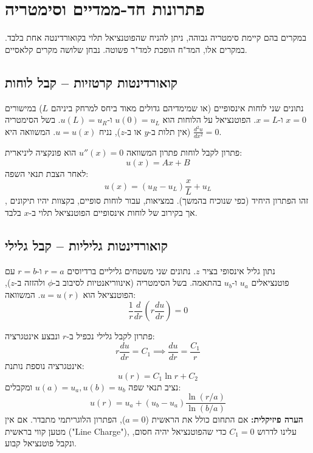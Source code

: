 \section{פתרונות חד-ממדיים וסימטריה}
במקרים בהם קיימת סימטריה גבוהה, ניתן להניח שהפוטנציאל תלוי בקואורדינטה אחת בלבד. במקרים אלו, המד"ח הופכת למד"ר פשוטה. נבחן שלושה מקרים קלאסיים.

\subsection{קואורדינטות קרטזיות – קבל לוחות}
נתונים שני לוחות אינסופיים (או שמימדיהם גדולים מאוד ביחס למרחק ביניהם $L$) במישורים $x=0$ ו-$x=L$. הפוטנציאל על הלוחות הוא $u(0)=u_L$ ו-$u(L)=u_R$.
בשל הסימטריה (אין תלות ב-$y$ או ב-$z$), נניח $u=u(x)$. המשוואה היא $\frac{d^2 u}{dx^2} = 0$.
\begin{center}
    
\end{center}

\begin{examplebox}{פתרון לקבל לוחות}
פתרון המשוואה $u''(x)=0$ הוא פונקציה ליניארית:
\[ u(x) = Ax + B \]
לאחר הצבת תנאי השפה:
\[ u(x) = (u_R - u_L)\frac{x}{L} + u_L \]
זהו הפתרון היחיד (כפי שנוכיח בהמשך). במציאות, עבור לוחות סופיים, בקצוות יהיו תיקונים , אך בקירוב של לוחות אינסופיים הפוטנציאל תלוי ב-$x$ בלבד.
\end{examplebox}

\subsection{קואורדינטות גליליות – קבל גלילי}
נתון גליל אינסופי בציר $z$. נתונים שני משטחים גליליים ברדיוסים $r=a$ ו-$r=b$ עם פוטנציאלים $u_a$ ו-$u_b$ בהתאמה.
בשל הסימטריה (אינווריאנטיות לסיבוב ב-$\phi$ ולהזזה ב-$z$), הפוטנציאל הוא $u=u(r)$.
המשוואה:
\[ \frac{1}{r} \frac{d}{dr} \left( r \frac{du}{dr} \right) = 0 \]

\begin{examplebox}{פתרון לקבל גלילי}
נכפיל ב-$r$ ונבצע אינטגרציה:
\[ r \frac{du}{dr} = C_1 \implies \frac{du}{dr} = \frac{C_1}{r} \]
אינטגרציה נוספת נותנת:
\[ u(r) = C_1 \ln r + C_2 \]
נציב תנאי שפה $u(a)=u_a, u(b)=u_b$ ומקבלים:
\[ u(r) = u_a + (u_b - u_a) \frac{\ln(r/a)}{\ln(b/a)} \]
\textbf{הערה פיזיקלית:} אם התחום כולל את הראשית ($a=0$), הפתרון הלוגריתמי מתבדר. אם אין מטען קווי בראשית ("Line Charge"), עלינו לדרוש $C_1=0$ כדי שהפוטנציאל יהיה חסום, ונקבל פוטנציאל קבוע.
\end{examplebox}


